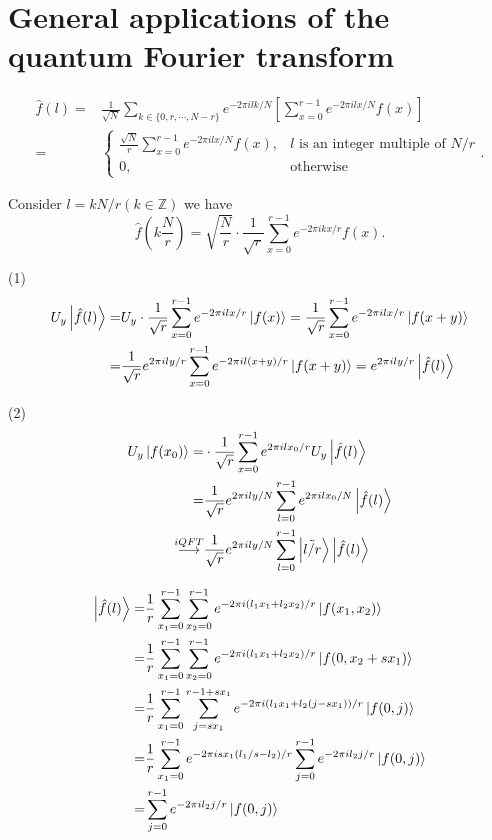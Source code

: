 \section{General applications of the quantum Fourier transform}

\ex $$\begin{aligned}
    \hat{f}(l) = & \frac{1}{\sqrt{N}}\sum_{k\in\{0,r,\cdots,N-r\}}e^{-2\pi ilk/N}\left[\sum_{x=0}^{r-1}e^{-2\pi ilx/N}f(x)\right]
    \\ = & \begin{cases}
    \frac{\sqrt{N}}{r}\sum_{x=0}^{r-1}e^{-2\pi ilx/N}f(x),&\text{$l$ is an integer multiple of $N/r$}\\
    0,&\text{otherwise}
\end{cases}.
\end{aligned}$$ 

\redstar Consider $l=kN/r(k\in\mathbb{Z})$ we have
$$\hat{f}(k\frac{N}{r}) = \sqrt{\frac{N}{r}}\cdot\frac{1}{\sqrt{r}}\sum_{x=0}^{r-1}e^{-2\pi ikx/r}f(x).$$

\ex (1) $$\begin{aligned}
    U_y\left|\hat{f}(l)\right\rangle
    = & U_y\cdot\frac{1}{\sqrt{r}}\sum_{x=0}^{r-1}e^{-2\pi ilx/r}\left|f(x)\right\rangle
    = \frac{1}{\sqrt{r}}\sum_{x=0}^{r-1}e^{-2\pi ilx/r}\left|f(x+y)\right\rangle
    \\ = & \frac{1}{\sqrt{r}}e^{2\pi ily/r}\sum_{x=0}^{r-1}e^{-2\pi il(x+y)/r}\left|f(x+y)\right\rangle
    = e^{2\pi ily/r}\left|\hat{f}(l)\right\rangle
\end{aligned}$$

(2) $$\begin{aligned}
    U_y\left|f(x_0)\right\rangle
    = & \cdot\frac{1}{\sqrt{r}}\sum_{x=0}^{r-1}e^{2\pi ilx_0/r}U_y\left|\hat{f}(l)\right\rangle
    \\ = & \frac{1}{\sqrt{r}}e^{2\pi ily/N}\sum_{l=0}^{r-1}e^{2\pi ilx_0/N}\left|\hat{f}(l)\right\rangle
    \\ \overset{iQFT}{\longrightarrow} & \frac{1}{\sqrt{r}}e^{2\pi ily/N}\sum_{l=0}^{r-1}\left|\tilde{l/r}\right\rangle\left|\hat{f}(l)\right\rangle
\end{aligned}$$

\ex $$\begin{aligned}
    \left|\hat{f}(l)\right\rangle
    = & \frac{1}{r}\sum_{x_1=0}^{r-1}\sum_{x_2=0}^{r-1}e^{-2\pi i(l_1x_1+l_2x_2)/r}\left|f(x_1,x_2)\right\rangle
    \\ = & \frac{1}{r}\sum_{x_1=0}^{r-1}\sum_{x_2=0}^{r-1}e^{-2\pi i(l_1x_1+l_2x_2)/r}\left|f(0,x_2+sx_1)\right\rangle
    \\ = & \frac{1}{r}\sum_{x_1=0}^{r-1}\sum_{j=sx_1}^{r-1+sx_1}e^{-2\pi i(l_1x_1+l_2(j-sx_1))/r}\left|f(0,j)\right\rangle
    \\ = & \frac{1}{r}\sum_{x_1=0}^{r-1}e^{-2\pi isx_1(l_1/s-l_2)/r}\sum_{j=0}^{r-1}e^{-2\pi il_2j/r}\left|f(0,j)\right\rangle
    \\ = & \sum_{j=0}^{r-1}e^{-2\pi il_2j/r}\left|f(0,j)\right\rangle
\end{aligned}$$


